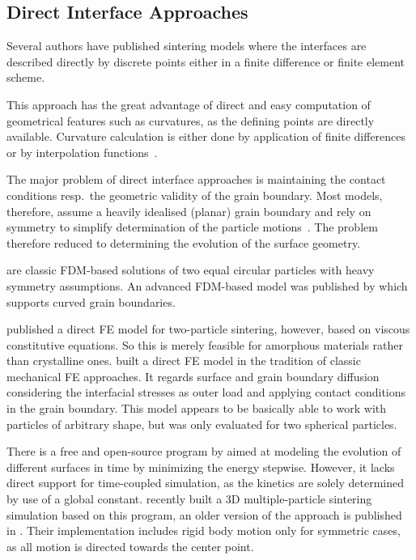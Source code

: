 \subsection{Direct Interface Approaches}\label{subsec:interfaces-direct}

Several authors have published sintering models where the interfaces are described directly by discrete points either in a finite difference or finite element scheme.

This approach has the great advantage of direct and easy computation of geometrical features such as curvatures, as the defining points are directly available.
Curvature calculation is either done by application of finite differences~\cite{Svoboda1995, Bouvard1996} or by interpolation functions~\cite{Svoboda1995, Nikolic1999, Jagota1988a, Lechelle2014}.

The major problem of direct interface approaches is maintaining the contact conditions resp.~the geometric validity of the grain boundary.
Most models, therefore, assume a heavily idealised (planar) grain boundary and rely on symmetry to simplify determination of the particle motions~\cite{Svoboda1995, Svoboda1992, Bouvard1996, Jagota1988a, Wakai2018}.
The problem therefore reduced to determining the evolution of the surface geometry.

\textcite{Svoboda1995, Bouvard1996} are classic \gls{FDM}-based solutions of two equal circular particles with heavy symmetry assumptions.
An advanced \gls{FDM}-based model was published by \textcite{Klinger2013, Klinger2012, Klinger2011} which supports curved grain boundaries.

\textcite{Jagota1988a} published a direct FE model for two-particle sintering, however, based on viscous constitutive equations.
So this is merely feasible for amorphous materials rather than crystalline ones.
\textcite{Lechelle2014} built a direct FE model in the tradition of classic mechanical FE approaches.
It regards surface and grain boundary diffusion considering the interfacial stresses as outer load and applying contact conditions in the grain boundary.
This model appears to be basically able to work with particles of arbitrary shape, but was only evaluated for two spherical particles.

There is a free and open-source program by \textcite{Brakke1992} aimed at modeling the evolution of different surfaces in time by minimizing the energy stepwise.
However, it lacks direct support for time-coupled simulation, as the kinetics are solely determined by use of a global constant.
\textcite{Wakai2022} recently built a 3D multiple-particle sintering simulation based on this program, an older version of the approach is published in \cite{Wakai2011, Wakai2018}.
Their implementation includes rigid body motion only for symmetric cases, as all motion is directed towards the center point.

